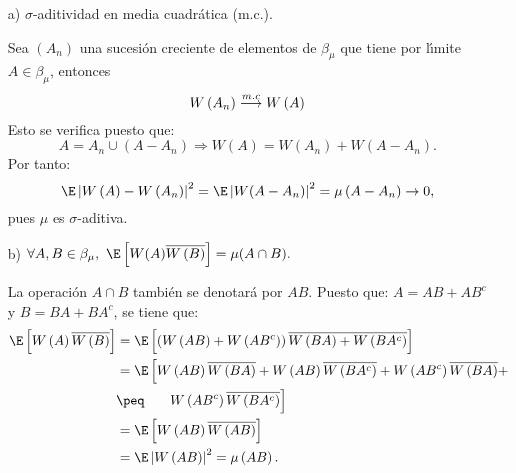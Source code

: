 \begin{enumerate}
\item[a)] $\sigma$-aditividad en media cuadr\'{a}tica (m.c.).

Sea $\left( A_{n} \right)$ una sucesi\'{o}n creciente de elementos de $\beta_{\mu }$ que tiene por l\'{\i}mite $A\in \beta_{\mu }$, entonces
\[
W\left( A_{n} \right)\buildrel {m.c} \over \longrightarrow W\left( A \right)
\]
Esto se verifica puesto que: 
\[
A=A_{n}\cup \left( A-A_{n} \right)\Longrightarrow W\left( A \right)=W\left( 
A_{n} \right)+W\left( A-A_{n} \right).
\]
Por tanto: 
\[
\E\left| W\left( A \right)-W\left( A_{n} \right) \right|^{2}=\E\left| 
W(A-A_{n}) \right|^{2}=\mu \left( A-A_{n} \right)\to 0,
\]
pues $\mu$ es $\sigma $-aditiva.

\item[b)] $\forall A, B\in \beta_{\mu },\ \E\left[ W(A)\overline{W\left( B \right)} \right]=\mu (A\cap B).$

La operaci\'{o}n $A\cap B$ tambi\'{e}n se denotar\'{a} por $AB$. Puesto que: 
$A=AB+AB^{c}$ y $B=BA+BA^{c}$, se tiene que:
\begin{align*}
 \E\left[ W\left( A \right)\overline{W\left( B \right)} \right]
	&= \E\left[ \left( W\left( AB \right)+W\left( AB^{c} \right) \right)\overline{W\left( BA \right)+W\left( BA^{c} \right)} \right]\\
	&= \E\left[ W\left( AB \right)\overline{W\left( BA \right)}+W\left( AB  \right)\overline{W\left( BA^{c} \right)}+W\left( AB^{c} \right)\overline{W\left( BA   \right)}+\right.\\
	&\peq \phantom{\E[[}\left.W\left( AB^{c} \right)\overline{W\left( BA^{c} \right)} \right]\\
	&=\E\left[ W\left( AB \right)\overline{W\left( AB \right)} \right]\\
	&=\E\left| W\left(AB \right) \right|^{2}=\mu \left( AB \right).
\end{align*}
\end{enumerate}

